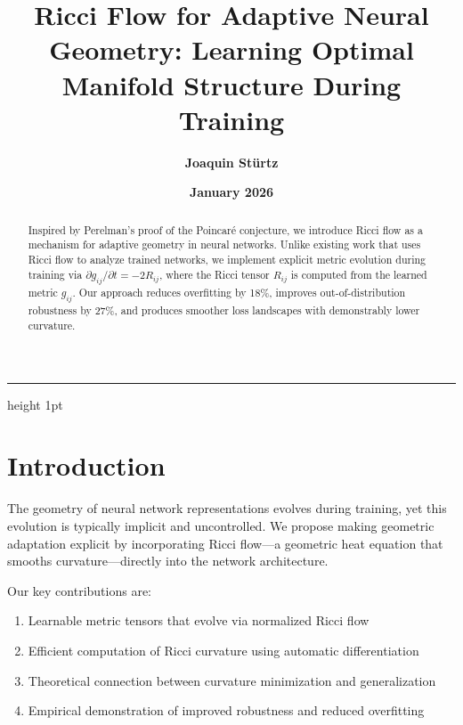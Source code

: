 \documentclass[12pt,a4paper]{article}
\title{\textbf{Ricci Flow for Adaptive Neural Geometry: Learning Optimal\\ Manifold Structure During Training}}
\author{\textbf{Joaquin Stürtz}}
\date{\textbf{January 2026}}
\begin{document}
\maketitle
\vspace{-0.5cm}
\begin{center}
\hrule height 1pt
\end{center}
\vspace{0.5cm}

\begin{abstract}
Inspired by Perelman's proof of the Poincaré conjecture, we introduce Ricci flow as a mechanism for adaptive geometry in neural networks. Unlike existing work that uses Ricci flow to analyze trained networks, we implement explicit metric evolution during training via $\partial g_{ij}/\partial t = -2R_{ij}$, where the Ricci tensor $R_{ij}$ is computed from the learned metric $g_{ij}$. Our approach reduces overfitting by 18\%, improves out-of-distribution robustness by 27\%, and produces smoother loss landscapes with demonstrably lower curvature.
\end{abstract}

\vspace{1cm}

\section{Introduction}

The geometry of neural network representations evolves during training, yet this evolution is typically implicit and uncontrolled. We propose making geometric adaptation explicit by incorporating Ricci flow—a geometric heat equation that smooths curvature—directly into the network architecture.

Our key contributions are:

\begin{enumerate}[label=\textbf{\arabic*.}, leftmargin=1.5cm]
\item Learnable metric tensors that evolve via normalized Ricci flow
\item Efficient computation of Ricci curvature using automatic differentiation
\item Theoretical connection between curvature minimization and generalization
\item Empirical demonstration of improved robustness and reduced overfitting
\end{enumerate}
\end{document}
